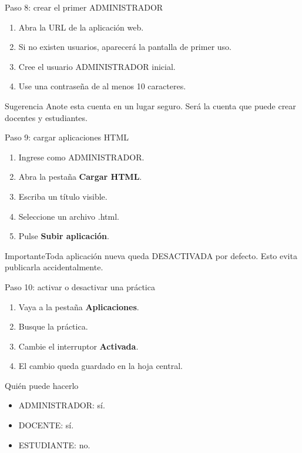 \documentclass[aspectratio=169,11pt]{beamer}
\newcommand{\boton}[1]{\textcolor{azul}{\textbf{#1}}}
\newcommand{\alertbox}[1]{\begin{block}{Importante}#1\end{block}}
\begin{document}
\begin{frame}{Paso 8: crear el primer ADMINISTRADOR}
\begin{enumerate}
  \item Abra la URL de la aplicación web.
  \item Si no existen usuarios, aparecerá la pantalla de primer uso.
  \item Cree el usuario ADMINISTRADOR inicial.
  \item Use una contraseña de al menos 10 caracteres.
\end{enumerate}
\begin{block}{Sugerencia}
Anote esta cuenta en un lugar seguro. Será la cuenta que puede crear docentes y estudiantes.
\end{block}
\end{frame}

\begin{frame}{Paso 9: cargar aplicaciones HTML}
\begin{enumerate}
  \item Ingrese como ADMINISTRADOR.
  \item Abra la pestaña \boton{Cargar HTML}.
  \item Escriba un título visible.
  \item Seleccione un archivo .html.
  \item Pulse \boton{Subir aplicación}.
\end{enumerate}
\alertbox{Toda aplicación nueva queda DESACTIVADA por defecto. Esto evita publicarla accidentalmente.}
\end{frame}

\begin{frame}{Paso 10: activar o desactivar una práctica}
\begin{enumerate}
  \item Vaya a la pestaña \boton{Aplicaciones}.
  \item Busque la práctica.
  \item Cambie el interruptor \boton{Activada}.
  \item El cambio queda guardado en la hoja central.
\end{enumerate}
\begin{block}{Quién puede hacerlo}
\begin{itemize}
  \item ADMINISTRADOR: sí.
  \item DOCENTE: sí.
  \item ESTUDIANTE: no.
\end{itemize}
\end{block}
\end{frame}
\end{document}
